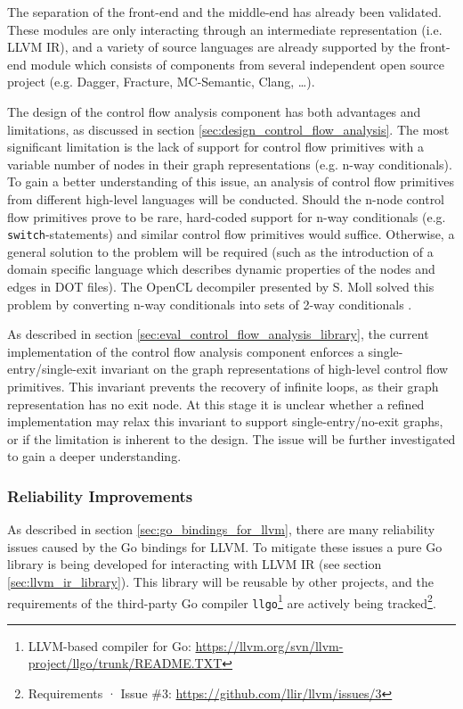 The separation of the front-end and the middle-end has already been validated. These modules are only interacting through an intermediate representation (i.e. LLVM IR), and a variety of source languages are already supported by the front-end module which consists of components from several independent open source project (e.g. Dagger, Fracture, MC-Semantic, Clang, …).

The design of the control flow analysis component has both advantages and limitations, as discussed in section \ref{sec:design_control_flow_analysis}. The most significant limitation is the lack of support for control flow primitives with a variable number of nodes in their graph representations (e.g. n-way conditionals). To gain a better understanding of this issue, an analysis of control flow primitives from different high-level languages will be conducted. Should the n-node control flow primitives prove to be rare, hard-coded support for n-way conditionals (e.g. \texttt{switch}-statements) and similar control flow primitives would suffice. Otherwise, a general solution to the problem will be required (such as the introduction of a domain specific language which describes dynamic properties of the nodes and edges in DOT files). The OpenCL decompiler presented by S. Moll solved this problem by converting n-way conditionals into sets of 2-way conditionals \cite{decomp_of_llvm}.

As described in section \ref{sec:eval_control_flow_analysis_library}, the current implementation of the control flow analysis component enforces a single-entry/single-exit invariant on the graph representations of high-level control flow primitives. This invariant prevents the recovery of infinite loops, as their graph representation has no exit node. At this stage it is unclear whether a refined implementation may relax this invariant to support single-entry/no-exit graphs, or if the limitation is inherent to the design. The issue will be further investigated to gain a deeper understanding.


\subsubsection{Reliability Improvements}

As described in section \ref{sec:go_bindings_for_llvm}, there are many reliability issues caused by the Go bindings for LLVM. To mitigate these issues a pure Go library is being developed for interacting with LLVM IR (see section \ref{sec:llvm_ir_library}). This library will be reusable by other projects, and the requirements of the third-party Go compiler \texttt{llgo}\footnote{LLVM-based compiler for Go: \url{https://llvm.org/svn/llvm-project/llgo/trunk/README.TXT}} are actively being tracked\footnote{Requirements · Issue \#3: \url{https://github.com/llir/llvm/issues/3}}.

